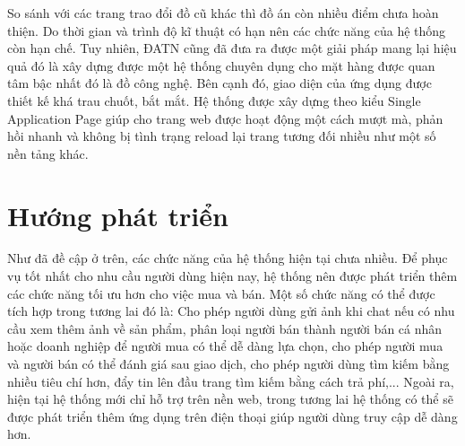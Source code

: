 \documentclass[../DoAn.tex]{subfiles}
\begin{document}
So sánh với các trang trao đổi đồ cũ khác thì đồ án còn nhiều điểm chưa hoàn thiện. Do thời gian và trình độ kĩ thuật có hạn nên các chức năng của hệ thống còn hạn chế. Tuy nhiên, ĐATN cũng đã đưa ra được một giải pháp mang lại hiệu quả đó là xây dựng được một hệ thống chuyên dụng cho mặt hàng được quan tâm bậc nhất đó là đồ công nghệ. Bên cạnh đó, giao diện của ứng dụng được thiết kế khá trau chuốt, bắt mắt. Hệ thống được xây dựng theo kiểu Single Application Page giúp cho trang web được hoạt động một cách mượt mà, phản hồi nhanh và không bị tình trạng reload lại trang tương đối nhiều như một số nền tảng khác.

\section{Hướng phát triển}
Như đã đề cập ở trên, các chức năng của hệ thống hiện tại chưa nhiều. Để phục vụ tốt nhất cho nhu cầu người dùng hiện nay, hệ thống nên được phát triển thêm các chức năng tối ưu hơn cho việc mua và bán. Một số chức năng có thể được tích hợp trong tương lai đó là: Cho phép người dùng gửi ảnh khi chat nếu có nhu cầu xem thêm ảnh về sản phẩm, phân loại người bán thành người bán cá nhân hoặc doanh nghiệp để người mua có thể dễ dàng lựa chọn, cho phép người mua và người bán có thể đánh giá sau giao dịch, cho phép người dùng tìm kiếm bằng nhiều tiêu chí hơn, đẩy tin lên đầu trang tìm kiếm bằng cách trả phí,... Ngoài ra, hiện tại hệ thống mới chỉ hỗ trợ trên nền web, trong tương lai hệ thống có thể sẽ được phát triển thêm ứng dụng trên điện thoại giúp người dùng truy cập dễ dàng hơn.
\end{document}
